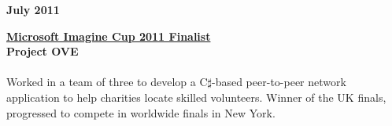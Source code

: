 \begin{minipage}[t]{0.20\linewidth}
    \textbf{July 2011}
\end{minipage} 
\begin{minipage}[t]{0.80\linewidth}
    \href{https://compete.imagine.microsoft.com/en-us/category/0?skillLevel=0}{\textbf{Microsoft Imagine Cup 2011 Finalist}}\\
    \textbf{Project OVE}\\
    \\
    Worked in a team of three to develop a C$\sharp$-based peer-to-peer network application to help charities locate skilled volunteers. Winner of the UK finals, progressed to compete in worldwide finals in New York.
\end{minipage}